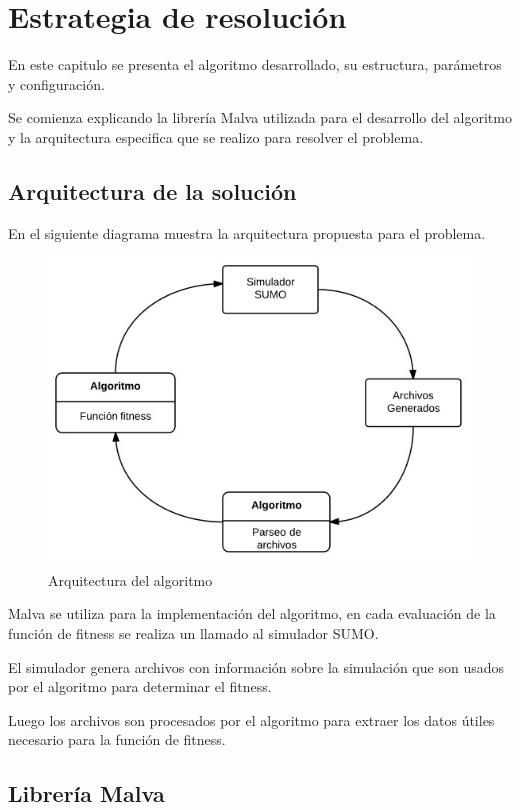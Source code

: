 \chapter{Estrategia de resolución}

En este capitulo se presenta el algoritmo desarrollado, su estructura, parámetros y configuración. 

Se comienza explicando la librería Malva utilizada para el desarrollo del algoritmo y la arquitectura especifica que se realizo para resolver el problema.

\section{Arquitectura de la solución}

En el siguiente diagrama muestra la arquitectura propuesta para el problema.

\begin{figure}[H]
\centering
\includegraphics[width=0.7\linewidth]{Figures/arquitectura1}
\caption{Arquitectura del algoritmo}
\label{fig:arquitectura1}
\end{figure}


Malva se utiliza para la implementación del algoritmo, en cada evaluación de la función de fitness se realiza un llamado al simulador SUMO. 

El simulador genera archivos con información sobre la simulación que son usados por el algoritmo para determinar el fitness.

Luego los archivos son procesados por el algoritmo para extraer los datos útiles necesario para la función de fitness.







\section{Librería Malva}

